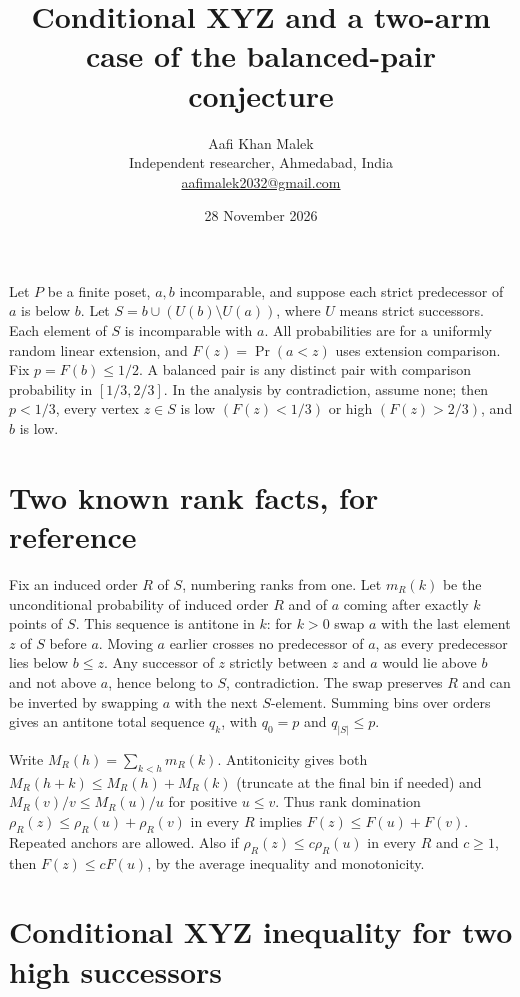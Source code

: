 \documentclass[11pt,letterpaper]{article}
\title{Conditional XYZ and a two-arm case of the balanced-pair conjecture}
\author{Aafi Khan Malek\\ \small Independent researcher, Ahmedabad, India\\
\small\href{mailto:aafimalek2032@gmail.com}{aafimalek2032@gmail.com}}
\date{28 November 2026}
\begin{document}
\maketitle

Let \(P\) be a finite poset, \(a,b\) incomparable, and suppose each
strict predecessor of \(a\) is below \(b\). Let
\(S={b}\cup(U(b)\setminus U(a))\), where \(U\) means strict successors.
Each element of \(S\) is incomparable with \(a\). All probabilities are
for a uniformly random linear extension, and \(F(z)=\Pr(a<z)\) uses
extension comparison. Fix \(p=F(b)\le1/2\). A balanced pair is any
distinct pair with comparison probability in \([1/3,2/3]\). In the
analysis by contradiction, assume none; then \(p<1/3\), every vertex
\(z\in S\) is low \((F(z)<1/3)\) or high \((F(z)>2/3)\), and \(b\) is
low.

\section{Two known rank facts, for
reference}\label{two-known-rank-facts-for-reference}

Fix an induced order \(R\) of \(S\), numbering ranks from one. Let
\(m_R(k)\) be the unconditional probability of induced order \(R\) and
of \(a\) coming after exactly \(k\) points of \(S\). This sequence is
antitone in \(k\): for \(k>0\) swap \(a\) with the last element \(z\) of
\(S\) before \(a\). Moving \(a\) earlier crosses no predecessor of
\(a\), as every predecessor lies below \(b\le z\). Any successor of
\(z\) strictly between \(z\) and \(a\) would lie above \(b\) and not
above \(a\), hence belong to \(S\), contradiction. The swap preserves
\(R\) and can be inverted by swapping \(a\) with the next \(S\)-element.
Summing bins over orders gives an antitone total sequence \(q_k\), with
\(q_0=p\) and \(q_{|S|}\le p\).

Write \(M_R(h)=\sum_{k<h}m_R(k)\). Antitonicity gives both
\(M_R(h+k)\le M_R(h)+M_R(k)\) (truncate at the final bin if needed) and
\(M_R(v)/v\le M_R(u)/u\) for positive \(u\le v\). Thus rank domination
\(\rho_R(z)\le\rho_R(u)+\rho_R(v)\) in every \(R\) implies
\(F(z)\le F(u)+F(v)\). Repeated anchors are allowed. Also if
\(\rho_R(z)\le c\rho_R(u)\) in every \(R\) and \(c\ge1\), then
\(F(z)\le cF(u)\), by the average inequality and monotonicity.

\section{Conditional XYZ inequality for two high
successors}\label{conditional-xyz-inequality-for-two-high-successors}
\end{document}
